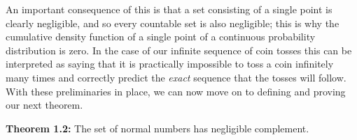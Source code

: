 An important consequence of this is that a set consisting of a single point is clearly negligible, and so every countable set is also negligible; this is why the cumulative density function of a single point of a continuous probability distribution is zero. In the case of our infinite sequence of coin tosses this can be interpreted as saying that it is practically impossible to toss a coin infinitely many times and correctly predict the \textit{exact} sequence that the tosses will follow. \\[-10pt]

With these preliminaries in place, we can now move on to defining and proving our next theorem.


 \quad

\textbf{Theorem 1.2:} The set of normal numbers has negligible complement.\\[-10pt]

